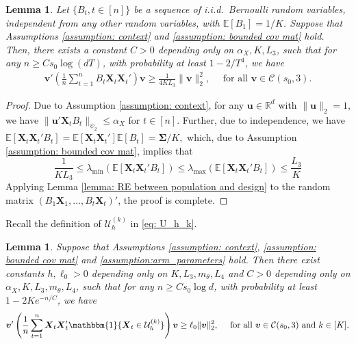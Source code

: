 \documentclass[aos,preprint]{imsart}
\theoremstyle{plain}
\newtheorem{lemma}[theorem]{Lemma}
\theoremstyle{definition}
\newcommand{\idf}{\mathbbm{1}}
\newcommand{\bX}{\boldsymbol{X}}
\newcommand{\bSigma}{\boldsymbol{\Sigma}}
\newcommand{\lmin}[1]{\lambda_{\min}\left(#1\right)}
\newcommand{\lmax}[1]{\lambda_{\max}\left(#1\right)}
\newcommand{\bu}{\boldsymbol{u}}
\newcommand{\bv}{\boldsymbol{v}}
\newcommand{\bR}{\mathbb{R}}
\newcommand{\Exp}{\mathbb{E}}
\begin{document}
\begin{appendix}
\begin{lemma} \label{lemma: Stage 1_restricted}
Let $\{B_t, t \in [n]\}$ be a sequence of i.i.d.~Bernoulli random variables,  independent from any other random variables, with $\Exp[B_1] = 1/K$.
Suppose that Assumptions \ref{assumption: context}  and \ref{assumption: bounded cov mat} hold.   Then, there exists a constant  $C >0$ depending only on $\alpha_X, K,  L_3$, such that for any $n\ge Cs_0\log (dT)$, with probability at least $1-2/T^4$, we have
\begin{align*}
    \bv'\left(\frac{1}{n}\sum_{t=1}^{n} B_t\bX_t\bX_t'  \right) \bv \ge \frac{1}{4KL_3}\|\bv\|_2^2,\quad \text{ for all } 
\bv\in \mathcal{C}(s_0,3). 
\end{align*} 
\end{lemma}
\begin{proof} 
Due to Assumption \ref{assumption: context}, for any $\bu \in \bR^{d}$ with $\|\bu\|_2=1$, we have $\|\bu' \bX_t B_t\|_{\psi_2} \leq \alpha_X$ for $t \in [n]$. Further, due to independence,
we have $\Exp\left[\bX_t\bX_t'B_t\right] = \Exp[\bX_t\bX_t'] \Exp[B_t] = \bSigma/K,
$
which, due to Assumption \ref{assumption: bounded cov mat}, implies that
$$
\frac{1}{K L_3}\le \lmin{\Exp[\bX_t\bX_t'B_t]}\le \lmax{\Exp[\bX_t\bX_t'B_t]} \le \frac{L_3}{K}
$$ Applying 
Lemma \ref{lemma: RE between population and design}  to the random matrix $(B_1\bX_1,\ldots, B_t\bX_t)'$, the proof is complete.
\end{proof}




Recall the definition of $\mathcal{U}_h^{(k)}$ in \eqref{eq: U_h_k}.

\begin{lemma}\label{lemma: arm optimality sample} 
Suppose that Assumptions \ref{assumption: context}, \ref{assumption: bounded cov mat} and \ref{assumption:arm_parameters} hold.   Then there exist constants $h,\ell_0>0$ depending only on $K,  L_3, m_{\theta}, L_4$ and $C >0$ depending only on $\alpha_X, K,  L_3, m_{\theta}, L_4$, such that for any $n\ge Cs_0\log d$, with probability at least $1-2Ke^{-n/C}$, we have
\begin{equation*}%
\bv'\left(\frac{1}{n}\sum_{t=1}^{n} \bX_t\bX_t'\idf\{\bX_t\in \mathcal{U}_{h}^{(k)}\} \right) \bv \ge \ell_0\|\bv\|_2^2,\quad \text{ for all } 
\bv\in \mathcal{C}(s_0,3) \text{ and } k \in [K].    
\end{equation*}



\end{lemma}
\end{appendix}
\end{document}
